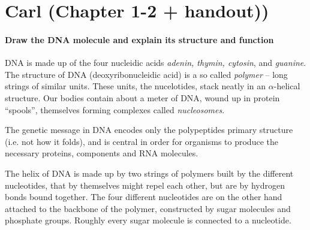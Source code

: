\documentclass[a4paper,12pt]{article}
\begin{document}
   \section{Carl (Chapter 1-2 + handout))}
      \paragraph{Draw the DNA molecule and explain its structure and function\\}
         
         DNA is made up of the four nucleidic acids \emph{adenin, thymin,
         cytosin}, and \emph{guanine}. The structure of DNA (deoxyribonucleidic
         acid) is a so called
         \emph{polymer} -- long strings of similar units. These units, the
         nucelotides, stack neatly in an $\alpha$-helical structure. Our bodies
         contain about a meter of DNA, wound up in protein ``spools'', themselves
         forming complexes called \emph{nucleosomes}. 

         The genetic message in DNA encodes only the polypeptides primary
         structure (i.e. not how it folds), and is central in order for organisms 
         to produce the necessary proteins, components and RNA molecules. 

         The helix of DNA is made up by two strings of polymers built by the 
         different nucleotides, that by themselves might repel each other, but
         are by hydrogen bonds bound together. The four different nucleotides
         are on the other hand attached to the backbone of the polymer,
         constructed by sugar molecules and phosphate groups. Roughly every
         sugar molecule is connected to a nucleotide.   

         \vspace{5cm}
\end{document}
